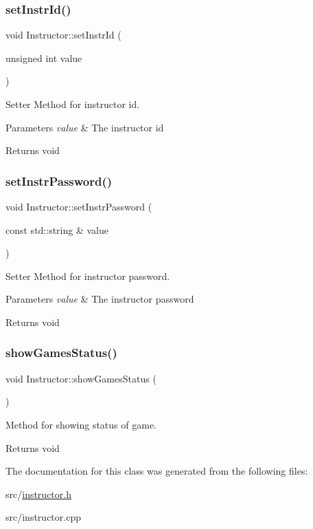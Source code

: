 \subsubsection{\texorpdfstring{set\+Instr\+Id()}{setInstrId()}}
{\footnotesize\ttfamily void Instructor\+::set\+Instr\+Id (\begin{DoxyParamCaption}\item[{unsigned int}]{value }\end{DoxyParamCaption})}



Setter Method for instructor id. 


\begin{DoxyParams}{Parameters}
{\em value} & The instructor id \\
\hline
\end{DoxyParams}
\begin{DoxyReturn}{Returns}
void 
\end{DoxyReturn}
\mbox{\label{classInstructor_a3df5460820d53f016f7e92a37ca70de9}} 
\subsubsection{\texorpdfstring{set\+Instr\+Password()}{setInstrPassword()}}
{\footnotesize\ttfamily void Instructor\+::set\+Instr\+Password (\begin{DoxyParamCaption}\item[{const std\+::string \&}]{value }\end{DoxyParamCaption})}



Setter Method for instructor password. 


\begin{DoxyParams}{Parameters}
{\em value} & The instructor password \\
\hline
\end{DoxyParams}
\begin{DoxyReturn}{Returns}
void 
\end{DoxyReturn}
\mbox{\label{classInstructor_a94f9564009326b43a3029fd3419e467b}} 
\subsubsection{\texorpdfstring{show\+Games\+Status()}{showGamesStatus()}}
{\footnotesize\ttfamily void Instructor\+::show\+Games\+Status (\begin{DoxyParamCaption}{ }\end{DoxyParamCaption})}



Method for showing status of game. 

\begin{DoxyReturn}{Returns}
void 
\end{DoxyReturn}


The documentation for this class was generated from the following files\+:\begin{DoxyCompactItemize}
\item 
src/\hyperlink{instructor_8h}{instructor.\+h}\item 
src/instructor.\+cpp\end{DoxyCompactItemize}
